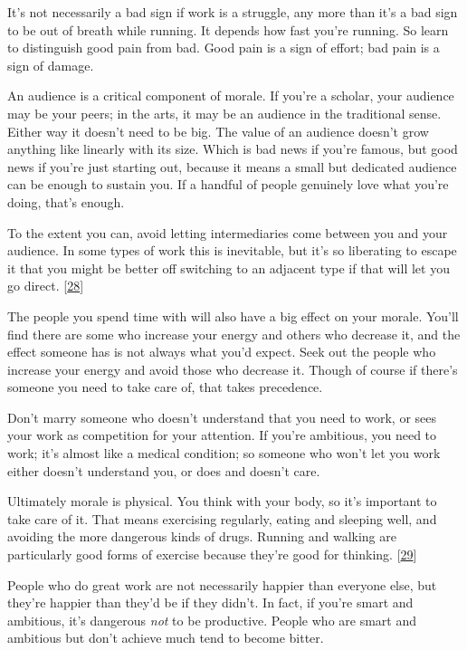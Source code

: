 It's not necessarily a bad sign if work is a struggle, any more than
it's a bad sign to be out of breath while running. It depends how fast
you're running. So learn to distinguish good pain from bad. Good pain is
a sign of effort; bad pain is a sign of damage.

An audience is a critical component of morale. If you're a scholar, your
audience may be your peers; in the arts, it may be an audience in the
traditional sense. Either way it doesn't need to be big. The value of an
audience doesn't grow anything like linearly with its size. Which is bad
news if you're famous, but good news if you're just starting out,
because it means a small but dedicated audience can be enough to sustain
you. If a handful of people genuinely love what you're doing, that's
enough.

To the extent you can, avoid letting intermediaries come between you and
your audience. In some types of work this is inevitable, but it's so
liberating to escape it that you might be better off switching to an
adjacent type if that will let you go direct. {[}\hyperref[f28n]{28}{]}

The people you spend time with will also have a big effect on your
morale. You'll find there are some who increase your energy and others
who decrease it, and the effect someone has is not always what you'd
expect. Seek out the people who increase your energy and avoid those who
decrease it. Though of course if there's someone you need to take care
of, that takes precedence.

Don't marry someone who doesn't understand that you need to work, or
sees your work as competition for your attention. If you're ambitious,
you need to work; it's almost like a medical condition; so someone who
won't let you work either doesn't understand you, or does and doesn't
care.

Ultimately morale is physical. You think with your body, so it's
important to take care of it. That means exercising regularly, eating
and sleeping well, and avoiding the more dangerous kinds of drugs.
Running and walking are particularly good forms of exercise because
they're good for thinking. {[}\hyperref[f29n]{29}{]}

People who do great work are not necessarily happier than everyone else,
but they're happier than they'd be if they didn't. In fact, if you're
smart and ambitious, it's dangerous \emph{not} to be productive. People
who are smart and ambitious but don't achieve much tend to become
bitter.

